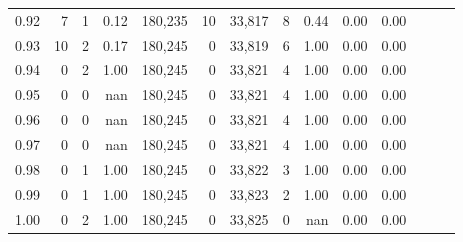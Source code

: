\begin{tabular}{rrrrrrrrrrrrrr}
0.92 &      7 &    1 &  0.12 &  180,235 &       10 &  33,817 &       8 &  0.44 &  0.00 &      0.00 \\
0.93 &     10 &    2 &  0.17 &  180,245 &        0 &  33,819 &       6 &  1.00 &  0.00 &      0.00 \\
0.94 &      0 &    2 &  1.00 &  180,245 &        0 &  33,821 &       4 &  1.00 &  0.00 &      0.00 \\
0.95 &      0 &    0 &   nan &  180,245 &        0 &  33,821 &       4 &  1.00 &  0.00 &      0.00 \\
0.96 &      0 &    0 &   nan &  180,245 &        0 &  33,821 &       4 &  1.00 &  0.00 &      0.00 \\
0.97 &      0 &    0 &   nan &  180,245 &        0 &  33,821 &       4 &  1.00 &  0.00 &      0.00 \\
0.98 &      0 &    1 &  1.00 &  180,245 &        0 &  33,822 &       3 &  1.00 &  0.00 &      0.00 \\
0.99 &      0 &    1 &  1.00 &  180,245 &        0 &  33,823 &       2 &  1.00 &  0.00 &      0.00 \\
1.00 &      0 &    2 &  1.00 &  180,245 &        0 &  33,825 &       0 &   nan &  0.00 &      0.00 \\
\bottomrule
\end{tabular}
